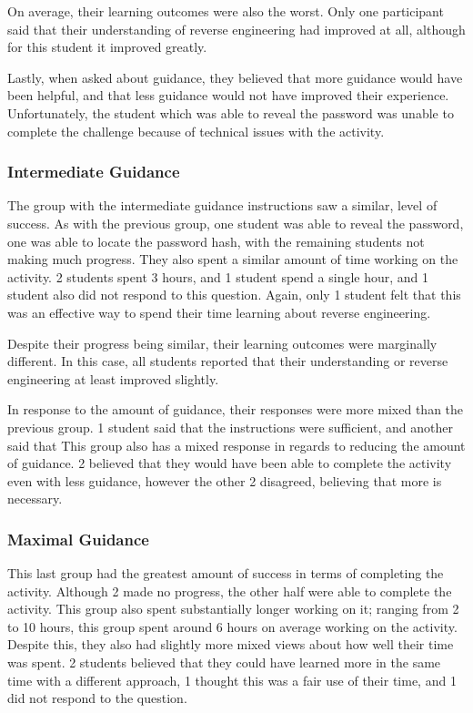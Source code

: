             On average, their learning outcomes were also the worst. 
            Only one participant said that their understanding of reverse engineering had improved at all, although for this student it improved greatly. 

            Lastly, when asked about guidance, they believed that more guidance would have been helpful, and that less guidance would not have improved their experience. 
            Unfortunately, the student which was able to reveal the password was unable to complete the challenge because of technical issues with the activity. 

        \subsubsection*{Intermediate Guidance}
            The group with the intermediate guidance instructions saw a similar, level of success. 
            As with the previous group, one student was able to reveal the password, one was able to locate the password hash, with the remaining students not making much progress. 
            They also spent a similar amount of time working on the activity. 
            2 students spent 3 hours, and 1 student spend a single hour, and 1 student also did not respond to this question. Again, only 1 student felt that this was an effective way to spend their time learning about reverse engineering. 

            Despite their progress being similar, their learning outcomes were marginally different. 
            In this case, all students reported that their understanding or reverse engineering at least improved slightly. 

            In response to the amount of guidance, their responses were more mixed than the previous group. 
            1 student said that the instructions were sufficient, and another said that  
            This group also has a mixed response in regards to reducing the amount of guidance. 
            2 believed that they would have been able to complete the activity even with less guidance, however the other 2 disagreed, believing that more is necessary. 

        \subsubsection*{Maximal Guidance}
            This last group had the greatest amount of success in terms of completing the activity. 
            Although 2 made no progress, the other half were able to complete the activity. 
            This group also spent substantially longer working on it; 
            ranging from 2 to 10 hours, this group spent around 6 hours on average working on the activity. 
            Despite this, they also had slightly more mixed views about how well their time was spent. 
            2 students believed that they could have learned more in the same time with a different approach, 1 thought this was a fair use of their time, and 1 did not respond to the question. 


